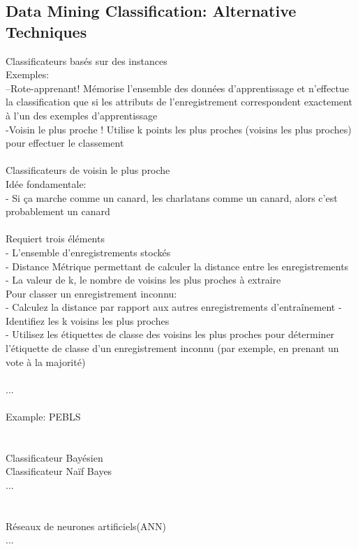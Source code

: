 \documentclass[5pt]{article}
\begin{document}
\begin{scriptsize}
\subsection{Data Mining  Classification: Alternative Techniques}
Classificateurs basés sur des instances\\
Exemples:\\
–Rote-apprenant! Mémorise l'ensemble des données d'apprentissage et n'effectue la classification que si les attributs de l'enregistrement correspondent exactement à l'un des exemples d'apprentissage\\
-Voisin le plus proche ! Utilise k points les plus proches (voisins les plus proches) pour effectuer le classement\\
\\
Classificateurs de voisin le plus proche\\
Idée fondamentale:\\
- Si ça marche comme un canard, les charlatans comme un canard, alors c’est probablement un canard\\
\\
Requiert trois éléments\\
- L'ensemble d'enregistrements stockés\\
- Distance Métrique permettant de calculer la distance entre les enregistrements\\
- La valeur de k, le nombre de voisins les plus proches à extraire\\
Pour classer un enregistrement inconnu:\\
- Calculez la distance par rapport aux autres enregistrements d'entraînement - Identifiez les k voisins les plus proches\\
- Utilisez les étiquettes de classe des voisins les plus proches pour déterminer l'étiquette de classe d'un enregistrement inconnu (par exemple, en prenant un vote à la majorité)\\
\\
...\\
\\
Example: PEBLS \\
\\
\\
Classificateur Bayésien\\
Classificateur Naïf Bayes\\
...\\
\\
\\
Réseaux de neurones artificiels(ANN) \\
...\\
\\
\end{scriptsize}
\end{document}
